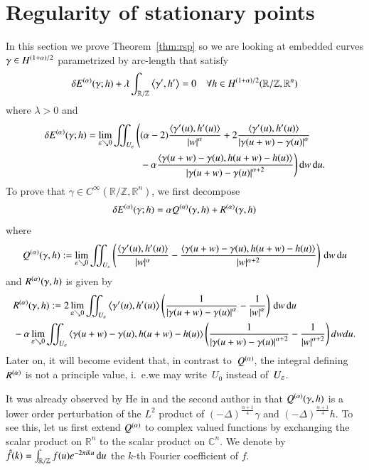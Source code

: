 \section{Regularity of stationary points}
\label{sect:bootstrap}

In this section we prove Theorem~\ref{thm:rsp} so we are
looking at embedded curves $\gamma \in \W[(1+\alpha)/2]$ parametrized by arc-length that satisfy
\begin{equation}\label{eq:ele}
 \delta\E(\gamma;h) + \lambda \int_{\mathbb R / \mathbb Z} \sp{\gamma',h'} =0 \quad \forall h \in \W[(1+\alpha)/2]
  (\mathbb R / \mathbb Z, \mathbb R^n)
\end{equation}
where $\lambda>0$ and
\begin{align*}
 \delta\E(\gamma;h) = \lim_{\varepsilon \searrow 0}  \iint_{U_\eps} \Bigg( &
    (\a-2) \frac{\sp{\dg(u),\dh(u)}}{\abs w^\a}
    + 2 \frac{\sp{\dg(u),\dh(u)}}{\abs{\D\g}^\a} \\
    &{}-\a \frac{\sp{\D\g,\D h}}{\abs{\D\g}^{\a+2}}
    \Bigg) \d w\d u.
\end{align*}
To prove that $\gamma \in C^\infty(\mathbb R / \mathbb Z, \mathbb R^n)$, we first decompose 
\begin{equation}\label{eq:decomposE}
 \delta\E(\g;h) = \a\Q(\g,h) + \RR(\gamma,h)
\end{equation}
where
\begin{equation*}
 \Q (\gamma, h ) := \lim_{\varepsilon \searrow 0} 
  \iint_{U_\varepsilon} 
    \left(\frac {\left\langle \gamma'(u), h'(u) \right\rangle }{|w|^\alpha} 
      -\frac {\left\langle \gamma(u+w)-\gamma(u), h(u+w) - h(u) \right\rangle}{|w|^{\alpha+2}} \right) \d w\d u
\end{equation*}
and $\RR(\gamma,h)$ is given by
\begin{align*}
&\RR(\gamma,h) :=
  2 \lim_{\eps\searrow0}\iint_{U_\eps} \sp{\dg(u),\dh(u)} \br{\frac1{\abs{\D\g}^{\a}} - \frac1{\abs w^{\a}}} \d w\d u \\
   &{}-\a\lim_{\eps\searrow0}\iint_{U_\eps} \sp{\D\g,\D h} \br{\frac1{\abs{\D\g}^{\a+2}} - \frac1{\abs w^{\a+2}}} d wd u.
\end{align*}
Later on, it will become evident that, in contrast to~$\Q$, the integral defining~$\RR$ is not a principle value, i.~e.\@ we may
write~$U_0$ instead of~$U_\eps$.

It was already observed by He in \cite{he:elghf} and the second author in \cite{reiter:rkepdc} that
$\Q(\gamma,h)$ is a lower order perturbation of the $L^2$ product of 
$(-\Delta)^{\frac {\alpha +1} 4} \gamma$ and $(-\Delta)^{\frac {\alpha +1} 4} h$.
To see this, let us first extend $\Q$ to complex valued functions
by exchanging the scalar product on $\mathbb R^n$ to the scalar product on $\mathbb C^n$.
We denote by $\hat f(k)= \int_{\mathbb R / \mathbb Z} f(u) e^{-2\pi i ku} \d u$ the $k$-th Fourier coefficient of $f$.

